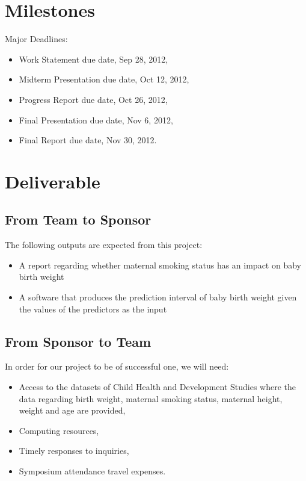 \documentclass[12pt,letterpaper]{article}
\theoremstyle{definition}
\begin{document}
\section{Milestones}
Major Deadlines:
\begin{itemize}
    \item Work Statement due date, Sep 28, 2012,
    \item Midterm Presentation due date, Oct 12, 2012,
    \item Progress Report due date, Oct 26, 2012,
    \item Final Presentation due date, Nov 6, 2012,
    \item Final Report due date, Nov 30, 2012.
\end{itemize}


\section{Deliverable}
\subsection{From Team to Sponsor} %
The following outputs are expected from this project:
\begin{itemize}
    \item A report regarding whether maternal smoking status has an impact on baby birth weight
    \item A software that produces the prediction interval of baby birth weight given the values of the predictors as the input
\end{itemize}

\subsection{From Sponsor to Team} %

In order for our project to be of successful one, we will need:
\begin{itemize}
    \item Access to the datasets of Child Health and Development Studies where the data regarding birth weight, maternal smoking status, maternal height, weight and age are provided,
    \item Computing resources,
    \item Timely responses to inquiries,
    \item Symposium attendance travel expenses.
\end{itemize}



\end{document}
